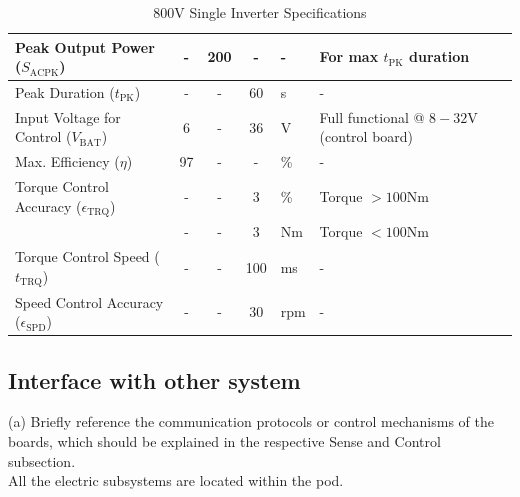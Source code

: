 \begin{table}[H]
\begin{adjustbox}{width=\textwidth,center}
\begin{tabular}{|l|c|c|c|l|l|}
        \hline
        Peak Output Power ($S_{\text{ACPK}}$) & - & 200 & - & - & For max $t_{\text{PK}}$ duration \\
        \hline
        Peak Duration ($t_{\text{PK}}$) & - & - & 60 & s & - \\
        \hline
        Input Voltage for Control ($V_{\text{BAT}}$) & 6 & - & 36 & V & Full functional @ $8-32$V (control board) \\
        \hline
        Max. Efficiency ($\eta$) & 97 & - & - & \% & - \\
        \hline
        Torque Control Accuracy ($\epsilon_{\text{TRQ}}$) & - & - & 3 & \% & Torque $>100$Nm \\
        \hline
         & - & - & 3 & Nm & Torque $<100$Nm \\
        \hline
        Torque Control Speed ($t_{\text{TRQ}}$) & - & - & 100 & ms & - \\
        \hline
        Speed Control Accuracy ($\epsilon_{\text{SPD}}$) & - & - & 30 & rpm & - \\
        \hline
    \end{tabular}
    \end{adjustbox}

    \caption{800V Single Inverter Specifications}
    \label{inverter_specs}
\end{table}

\subsection{Interface with other system}
(a) Briefly reference the communication protocols or control mechanisms of the boards, which should be explained in the respective Sense and Control subsection. \\
All the electric subsystems are located within the pod. \\

